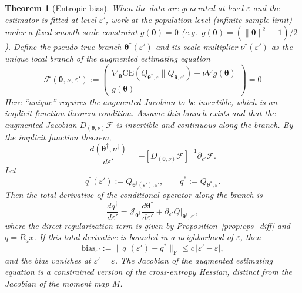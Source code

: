 \documentclass[11pt,a4paper]{article}
\newtheorem{theorem}{Theorem}[section]
\theoremstyle{remark}
\begin{document}
\begin{theorem}[Entropic bias]\label{thm:T3b}
When the data are generated at level $\varepsilon$ and the estimator is fitted at level
$\varepsilon'$, work at the population level (infinite-sample limit) under a fixed smooth
scale constraint $g(\bm{\theta})=0$ (e.g.\
$g(\bm{\theta})=(\|\bm{\theta}\|^2-1)/2$). Define the pseudo-true branch
$\bm{\theta}^{\dagger}(\varepsilon')$ and its scale multiplier $\nu^{\dagger}(\varepsilon')$
as the unique local branch of the augmented estimating equation
\[
\mathscr F(\bm{\theta},\nu,\varepsilon'):=
\begin{pmatrix}
\nabla_{\bm{\theta}}\mathrm{CE}(Q_{\bm{\theta}^*,\varepsilon}\|Q_{\bm{\theta},\varepsilon'})+\nu\nabla g(\bm{\theta})\\
g(\bm{\theta})
\end{pmatrix}=0
\]
Here ``unique'' requires the augmented Jacobian to be invertible, which is an implicit
function theorem condition. Assume this branch exists and that the augmented Jacobian
$D_{(\bm{\theta},\nu)}\mathscr F$ is invertible and continuous along the branch. By the
implicit function theorem,
\[
\frac{d(\bm{\theta}^{\dagger},\nu^{\dagger})}{d\varepsilon'}
=-[D_{(\bm{\theta},\nu)}\mathscr F]^{-1}\partial_{\varepsilon'}\mathscr F.
\]
Let
\[
q^{\dagger}(\varepsilon'):=Q_{\bm{\theta}^{\dagger}(\varepsilon'),\varepsilon'},
\qquad q^*:=Q_{\bm{\theta}^*,\varepsilon}.
\]
Then the total derivative of the conditional operator along the branch is
\[
\frac{dq^{\dagger}}{d\varepsilon'}
=\mathcal J_{\bm{\theta}^{\dagger}}\frac{d\bm{\theta}^{\dagger}}{d\varepsilon'}
+\partial_{\varepsilon'}Q\big|_{\bm{\theta}^{\dagger},\varepsilon'},
\]
where the direct regularization term is given by Proposition~\ref{prop:eps_diff} and
$q=R_a x$. If this total derivative is bounded in a neighborhood of $\varepsilon$, then
\[
\mathrm{bias}_{\varepsilon'}:=\|q^{\dagger}(\varepsilon')-q^*\|_{\mathrm F}
\le c\,|\varepsilon'-\varepsilon|,
\]
and the bias vanishes at $\varepsilon'=\varepsilon$. The Jacobian of the augmented
estimating equation is a constrained version of the cross-entropy Hessian, distinct from
the Jacobian of the moment map $M$.
\end{theorem}
\end{document}
